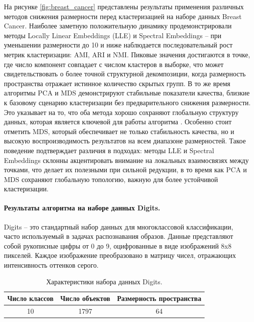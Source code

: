                 На рисунке \ref{fig:breast_cancer} представлены результаты применения различных методов снижения размерности перед кластеризацией \kmeans{} на наборе данных Breast Cancer. Наиболее заметную положительную динамику продемонстрировали методы Locally Linear Embeddings (LLE) и Spectral Embeddings -- при уменьшении размерности до 10 и ниже наблюдается последовательный рост метрик кластеризации: AMI, ARI и NMI. Пиковые значения достигаются в точке, где число компонент совпадает с числом кластеров в выборке, что может свидетельствовать о более точной структурной декомпозиции, когда размерность пространства отражает истинное количество скрытых групп. В то же время алгоритмы PCA и MDS демонстрируют стабильные показатели качества, близкие к базовому сценарию кластеризации без предварительного снижения размерности. Это указывает на то, что оба метода хорошо сохраняют глобальную структуру данных, которая является ключевой для работы алгоритма \kmeans{}. Особенно стоит отметить MDS, который обеспечивает не только стабильность качества, но и высокую воспроизводимость результатов на всем диапазоне размерностей. Такое поведение подтверждает различия в подходах: методы LLE и Spectral Embeddings склонны акцентировать внимание на локальных взаимосвязях между точками, что делает их полезными при сильной редукции, в то время как PCA и MDS сохраняют глобальную топологию, важную для более устойчивой кластеризации.

            \paragraph{Результаты алгоритма на наборе данных Digits.}
                Digits -- это стандартный набор данных для многоклассовой классификации, часто используемый в задачах распознавания образов. Данные представляют собой рукописные цифры от 0 до 9, оцифрованные в виде изображений 8x8 пикселей. Каждое изображение преобразовано в матрицу чисел, отражающих интенсивность оттенков серого.

                \begin{table}[H]
                    \centering
                    \caption{Характеристики набора данных Digits.}
                    \begin{tabular}{ccc}
                        \toprule
                        Число классов & Число объектов & Размерность пространства \\
                        \midrule
                        10 & 1797 & 64 \\
                        \bottomrule
                    \end{tabular}
                \end{table}

